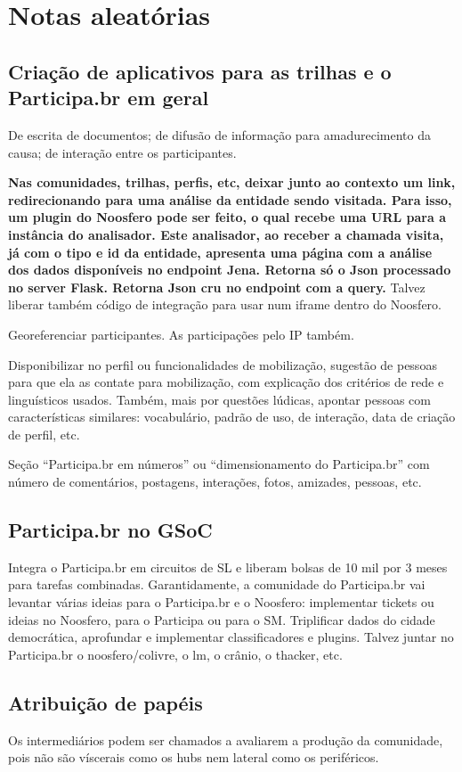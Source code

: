 \documentclass[12pt]{report}
\begin{document}
\part{Notas aleatórias}

\chapter{Criação de aplicativos para as trilhas e o Participa.br em geral}
De escrita de documentos; de difusão de informação para amadurecimento da causa; de interação entre os participantes.

{\bf Nas comunidades, trilhas, perfis, etc, deixar junto ao contexto um link, redirecionando para uma análise da entidade sendo visitada. Para isso, um plugin do Noosfero pode ser feito, o qual recebe uma URL para a instância do analisador. Este analisador, ao receber a chamada visita, já com o tipo e id da entidade, apresenta uma página com a análise dos dados disponíveis no endpoint Jena. Retorna só o Json processado no server Flask. Retorna Json cru no endpoint com a query.} Talvez liberar também código de integração para usar num iframe dentro do Noosfero.

Georeferenciar participantes. As participações pelo IP também.

Disponibilizar no perfil ou funcionalidades de mobilização, sugestão de pessoas para que ela as contate para mobilização, com explicação dos critérios de rede e linguísticos usados. Também, mais por questões lúdicas, apontar pessoas com características similares: vocabulário, padrão de uso, de interação, data de criação de perfil, etc.

Seção ``Participa.br em números'' ou ``dimensionamento do Participa.br'' com número de comentários, postagens, interações, fotos, amizades, pessoas, etc.

\chapter{Participa.br no GSoC}
Integra o Participa.br em circuitos de SL e liberam bolsas de 10 mil por 3 meses para tarefas combinadas. Garantidamente, a comunidade do Participa.br vai levantar várias ideias para o Participa.br e o Noosfero: implementar tickets ou ideias no Noosfero, para o Participa ou para o SM. Triplificar dados do cidade democrática, aprofundar e implementar classificadores e plugins. Talvez juntar no Participa.br o noosfero/colivre, o lm, o crânio, o thacker, etc.

\chapter{Atribuição de papéis}
Os intermediários podem ser chamados a avaliarem a produção da comunidade, pois não são víscerais como os hubs nem lateral como os periféricos.
\end{document}
